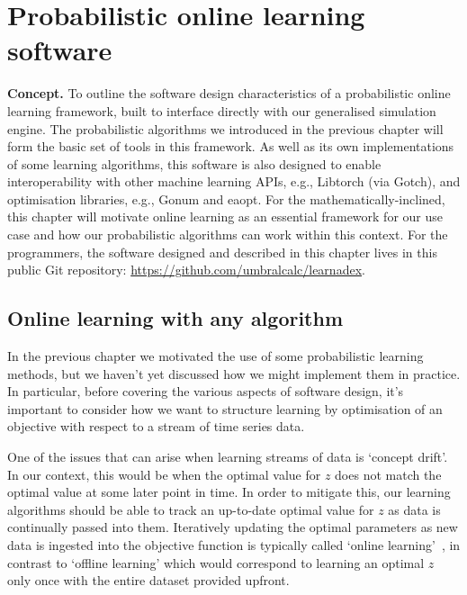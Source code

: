 \chapter{\sffamily Probabilistic online learning software}

{\bfseries\sffamily Concept.} To outline the software design characteristics of a probabilistic online learning framework, built to interface directly with our generalised simulation engine. The probabilistic algorithms we introduced in the previous chapter will form the basic set of tools in this framework. As well as its own implementations of some learning algorithms, this software is also designed to enable interoperability with other machine learning APIs, e.g., Libtorch (via Gotch), and optimisation libraries, e.g., Gonum and eaopt. For the mathematically-inclined, this chapter will motivate online learning as an essential framework for our use case and how our probabilistic algorithms can work within this context. For the programmers, the software designed and described in this chapter lives in this public Git repository: \href{https://github.com/umbralcalc/learnadex}{https://github.com/umbralcalc/learnadex}.

\section{\sffamily Online learning with any algorithm}

In the previous chapter we motivated the use of some probabilistic learning methods, but we haven't yet discussed how we might implement them in practice. In particular, before covering the various aspects of software design, it's important to consider how we want to structure learning by optimisation of an objective with respect to a stream of time series data. 

One of the issues that can arise when learning streams of data is `concept drift'. In our context, this would be when the optimal value for $z$ does not match the optimal value at some later point in time. In order to mitigate this, our learning algorithms should be able to track an up-to-date optimal value for $z$ as data is continually passed into them. Iteratively updating the optimal parameters as new data is ingested into the objective function is typically called `online learning'~\cite{hazan2016introduction,sutton2018reinforcement}, in contrast to `offline learning' which would correspond to learning an optimal $z$ only once with the entire dataset provided upfront.

